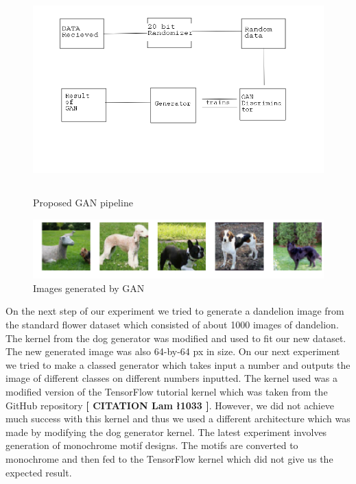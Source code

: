 \documentclass{article}
\begin{document}
    \begin{figure}[H]
        \centering
        \includegraphics[height=8cm]{images/GAN/Generalworkflow.png}
        \caption{Proposed GAN pipeline}
    \end{figure}
    
    \begin{figure}[H]
        \centering
        \includegraphics[scale=0.5]{images/dogGAN.png}
        \caption{Images generated by GAN}
    \end{figure}
    On the next step of our experiment we tried to generate a dandelion image from the standard flower dataset which consisted of about 1000 images of dandelion. The kernel from the dog generator was modified and used to fit our new dataset. The new generated image was also 64-by-64 px in size.
    On our next experiment we tried to make a classed generator which takes input a number and outputs the image of different classes on different numbers inputted. The kernel used was a modified version of the TensorFlow tutorial kernel which was taken from the GitHub repository \textbf{[ CITATION Lam \l 1033 ]}. However, we did not achieve much success with this kernel and thus we used a different architecture which was made by modifying the dog generator kernel.
    The latest experiment involves generation of monochrome motif designs. The motifs are converted to monochrome and then fed to the TensorFlow kernel which did not give us the expected result.
\end{document}
